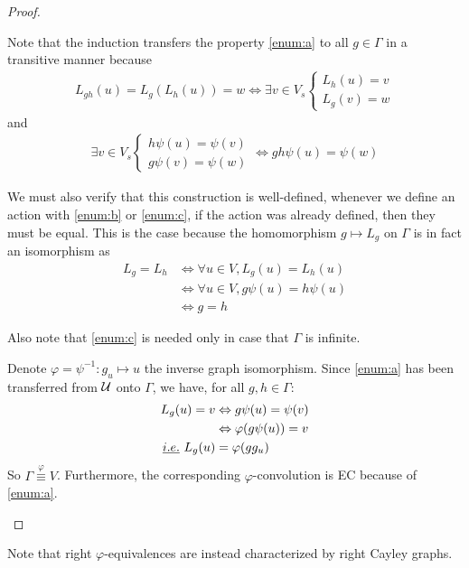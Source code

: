 \begin{proof}
\begin{enumerate}
Note that the induction transfers the property \ref{enum:a} to all $g \in \Gamma$ in a transitive manner because
\begin{gather*}
L_{gh}(u) = L_g(L_h(u)) = w \Leftrightarrow \exists v \in V_s
\begin{cases}
L_h(u) = v\\
L_g(v) = w
\end{cases}
\end{gather*}
and
\begin{gather*}
\exists v \in V_s
\begin{cases}
h\psi(u) = \psi(v)\\
g\psi(v) = \psi(w)
\end{cases}
\Leftrightarrow gh\psi(u) = \psi(w)
\end{gather*}

We must also verify that this construction is well-defined, \ie whenever we define an action with \ref{enum:b} or \ref{enum:c}, if the action was already defined, then they must be equal. This is the case because the homomorphism $g \mapsto L_g$ on $\Gamma$ is in fact an isomorphism as
\begin{align*}
L_g = L_h & \Leftrightarrow \forall u \in V, L_g(u) = L_h(u)\\
 & \Leftrightarrow \forall u \in V, g\psi(u) = h\psi(u)\\
 & \Leftrightarrow g = h
\end{align*}

Also note that \ref{enum:c} is needed only in case that $\Gamma$ is infinite.

Denote $\varphi = \psi^{-1}: g_u \mapsto u$ the inverse graph isomorphism. Since \ref{enum:a} has been transferred from $\mathcal{U}$ onto $\Gamma$, we have, for all $g,h \in \Gamma$:
\begin{align*}
L_g(u) = v &\Leftrightarrow g\psi(u) = \psi(v)\\
           &\Leftrightarrow \varphi(g\psi(u)) = v\\
\emph{i.e.}~ L_g(u) &= \varphi(gg_u)
\end{align*}
So $\Gamma \overset\varphi\equiv V$. Furthermore, the corresponding $\varphi$-convolution is EC because of \ref{enum:a}.
\end{enumerate}
\end{proof}

\begin{remark}
Note that right $\varphi$-equivalences are instead characterized by right Cayley graphs.
\end{remark}


